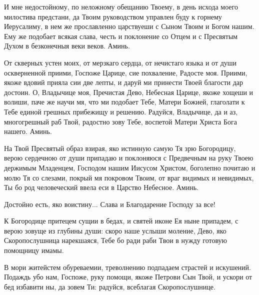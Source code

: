 И мне недостойному, по неложному обещанию Твоему, в день исхода моего милостива предстани, да Твоим руководством управлен буду к горнему Иерусалиму, в нем же прославленно царствуеши с Сыном Твоим и Богом нашим. Ему же подобает всякая слава, честь и поклонение со Отцем и с Пресвятым Духом в безконечныя веки веков. Аминь.

От скверных устен моих, от мерзкаго сердца, от нечистаго языка и от души оскверненной приими, Госпоже Царице, сие похваление, Радосте моя. Приими, якоже вдовий прияла сии две лепты, и даруй ми принести Твоей благости дар достоин. О, Владычице моя, Пречистая Дево, Небесная Царице, якоже хощеши и волиши, паче же научи мя, что ми подобает Тебе, Матери Божией, глаголати к Тебе единой грешных прибежищу и решению. Радуйся, Владычице, да и аз, многогрешный раб Твой, радостно зову Тебе, воспетой Матери Христа Бога нашего. Аминь.

На Твой Пресвятый образ взирая, яко истинную самую Тя зрю Богородицу, верою сердечною от души припадаю и поклоняюся с Предвечным на руку Твоею держимым Младенцем, Господом нашим Иисусом Христом, боголепно почитаю и молю Тя со слезами, покрый мя покровом Твоим, от враг видимых и невидимых, Ты бо род человеческий ввела еси в Царство Небесное. Аминь.




Достойно есть, яко воистину... Слава и Благодарение Господу за все!
\mychapterending

 




К Богородице притецем сущии в бедах, и святей иконе Ея ныне припадем, с верою зовуще из глубины души: скоро наше услыши моление, Дево, яко Скоропослушница нарекшаяся, Тебе бо ради раби Твои в нужду готовую помощницу имамы.




В мори житейстем обуреваемии, треволнению подпадаем страстей и искушений. Подаждь убо нам, Госпоже, руку помощи, якоже Петрови Сын Твой, и ускори от бед избавити ны, да зовем Ти: радуйся, всеблагая Скоропослушнице.




